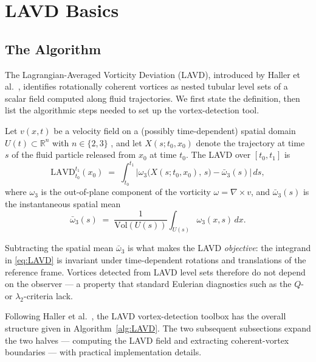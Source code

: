 \documentclass[../main.tex]{subfiles}
\begin{document}
\section{LAVD Basics}

\subsection{The Algorithm}

The Lagrangian-Averaged Vorticity Deviation (LAVD), introduced by Haller et al.\ \cite{haller2016defining}, identifies rotationally coherent vortices as nested tubular level sets of a scalar field computed along fluid trajectories. We first state the definition, then list the algorithmic steps needed to set up the vortex-detection tool.

\begin{definition}
Let $v(x,t)$ be a velocity field on a (possibly time-dependent) spatial domain $U(t)\subset\mathbb{R}^n$ with $n\in\{2,3\}$ , and let $X(s;t_0,x_0)$ denote the trajectory at time $s$ of the fluid particle released from $x_0$ at time $t_0$. The LAVD over $[t_0, t_1]$ is
\begin{equation}
    \mathrm{LAVD}_{t_0}^{t_1}(x_0) \;=\; \int_{t_0}^{t_1} \bigl|\omega_3\bigl(X(s;t_0,x_0),\,s\bigr) - \bar{\omega}_3(s)\bigr|\,ds,
    \label{eq:LAVD}
\end{equation}
where $\omega_3$ is the out-of-plane component of the vorticity $\omega = \nabla \times v$, and $\bar{\omega}_3(s)$ is the instantaneous spatial mean
\begin{equation}
    \bar{\omega}_3(s) \;=\; \frac{1}{\mathrm{Vol}(U(s))} \int_{U(s)} \omega_3(x,s)\,dx.
    \label{eq:mean_vorticity}
\end{equation}
\end{definition}

\begin{remark}[Objectivity]
Subtracting the spatial mean $\bar{\omega}_3$ is what makes the LAVD \emph{objective}: the integrand in \eqref{eq:LAVD} is invariant under time-dependent rotations and translations of the reference frame. Vortices detected from LAVD level sets therefore do not depend on the observer --- a property that standard Eulerian diagnostics such as the $Q$- or $\lambda_2$-criteria lack.
\end{remark}

Following Haller et al.\ \cite[p.~151]{haller2016defining}, the LAVD vortex-detection toolbox has the overall structure given in Algorithm~\ref{alg:LAVD}. The two subsequent subsections expand the two halves --- computing the LAVD field and extracting coherent-vortex boundaries --- with practical implementation details.
\end{document}
